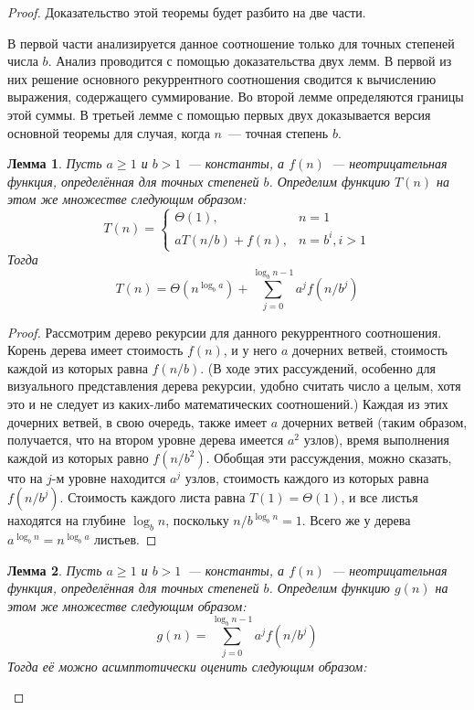 \documentclass[a4paper,12pt]{article}
\newtheorem*{lemma}{Лемма}
\begin{document}
\begin{proof}
	Доказательство этой теоремы будет разбито на две части. 
	
	В первой части анализируется данное соотношение только для точных степеней числа \(b\). Анализ проводится с помощью доказательства двух лемм. В первой из них
	решение основного рекуррентного соотношения сводится к вычислению выражения, содержащего суммирование. Во второй лемме определяются границы этой суммы. В третьей лемме с помощью первых двух доказывается версия основной
	теоремы для случая, когда \(n\)~--- точная степень \(b\).
	
	\begin{lemma}
		Пусть \(a \geqslant 1\) и \(b > 1\)~--- константы, а \(f(n)\)~--- неотрицательная функция, определённая для точных степеней \(b\). Определим функцию \(T(n)\) на этом же множестве следующим образом:
		\[T(n) = \begin{cases}
		\Theta(1), & n = 1 \\
		aT(n/b) + f(n), & n = b^i, i > 1
		\end{cases}\]
		Тогда \[T(n) = \Theta(n^{\log_b a}) + \sum_{j = 0}^{\log_b n - 1}a^j f(n/b^j)\]
	\end{lemma}
	\begin{proof}
		Рассмотрим дерево рекурсии для данного рекуррентного соотношения. Корень дерева имеет стоимость \(f(n)\), и у него \(a\) дочерних ветвей, стоимость каждой из которых равна \(f(n/b)\). (В ходе этих рассуждений, особенно для
		визуального представления дерева рекурсии, удобно считать число а целым, хотя это и не следует из каких-либо математических соотношений.) Каждая из этих
		дочерних ветвей, в свою очередь, также имеет \(a\) дочерних ветвей (таким образом, получается, что на втором уровне дерева имеется \(a^2\) узлов), время выполнения каждой из которых равно \(f(n/b^2)\). Обобщая эти рассуждения, можно сказать, что на \(j\)-м уровне находится \(a^j\) узлов, стоимость каждого из которых равна \(f(n/b^j)\). Стоимость каждого листа равна \(T(1) = \Theta(1)\), и все листья находятся на глубине \(\log_b n\), поскольку \(n/b^{\log_b n} = 1\). Всего же у дерева \(a^{\log_b n} = n^{\log_b a}\) листьев.
	\end{proof}
	\begin{lemma}
		Пусть \(a \geqslant 1\) и \(b > 1\)~--- константы, а \(f(n)\)~--- неотрицательная функция, определённая для точных степеней \(b\). Определим функцию \(g(n)\) на этом же множестве следующим образом:
		\[g(n) = \sum_{j = 0}^{\log_b n - 1}a^j f(n/b^j)\]
		Тогда её можно асимптотически оценить следующим образом:

\end{lemma}
\end{proof}
\end{document}
